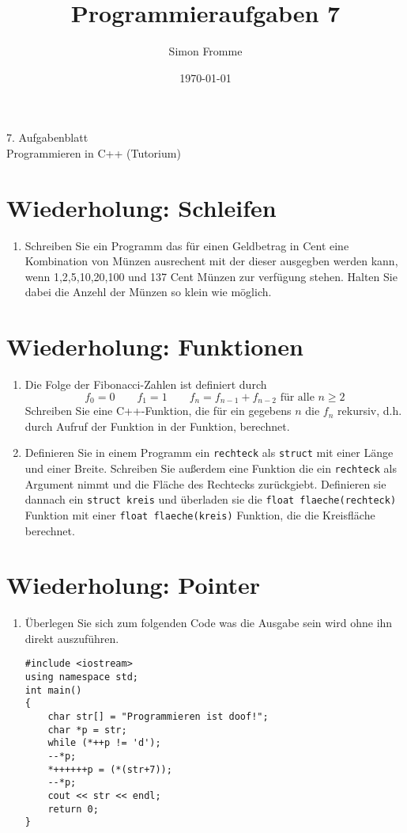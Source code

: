 \documentclass[paper=a4, fontsize=11pt, twoside]{scrartcl}
\title{Programmieraufgaben 7}
\author{Simon Fromme}
\date{\normalsize\today}
\begin{document}
\vspace*{0.75\baselineskip}
\begin{center}
  \Large 7. Aufgabenblatt \\\vspace{0.5em} \large Programmieren in C++ (Tutorium)
\end{center}
\section*{Wiederholung: Schleifen}
\begin{enumerate}
	\item Schreiben Sie ein Programm das für einen Geldbetrag in Cent eine Kombination von Münzen ausrechent mit der dieser ausgegben werden kann, wenn 1,2,5,10,20,100 und 137 Cent Münzen zur verfügung stehen. Halten Sie dabei die Anzehl der Münzen so klein wie möglich. 
\end{enumerate}


\section*{Wiederholung: Funktionen}
\begin{enumerate}
  \item Die Folge der Fibonacci-Zahlen ist definiert durch 
	  \[
		  f_0=0 \qquad f_1=1 \qquad f_n=f_{n-1} + f_{n-2} \text{ für alle } n\geq 2
	  \]
	  Schreiben Sie eine C++-Funktion, die für ein gegebens $n$ die $f_n$ rekursiv, d.h. durch Aufruf der Funktion in der Funktion, berechnet.
  \item Definieren Sie in einem Programm ein \texttt{rechteck} als \texttt{struct} mit einer Länge und einer Breite.
	  Schreiben Sie außerdem eine Funktion die ein \texttt{rechteck} als Argument nimmt und die Fläche des Rechtecks zurückgiebt. 
	  Definieren sie dannach ein \texttt{struct kreis} und überladen sie die \texttt{float flaeche(rechteck)} Funktion mit einer \texttt{float flaeche(kreis)} Funktion, die die Kreisfläche berechnet.
\end{enumerate}

\section*{Wiederholung: Pointer}
\begin{enumerate}
  \item Überlegen Sie sich zum folgenden Code was die Ausgabe sein wird ohne ihn direkt auszuführen. 
	  \begin{verbatim}
#include <iostream>
using namespace std;
int main()
{
	char str[] = "Programmieren ist doof!";
	char *p = str;
	while (*++p != 'd');
	--*p;
	*++++++p = (*(str+7));
	--*p;
	cout << str << endl;
	return 0;
}
	  \end{verbatim}
\end{enumerate}
\end{document}
